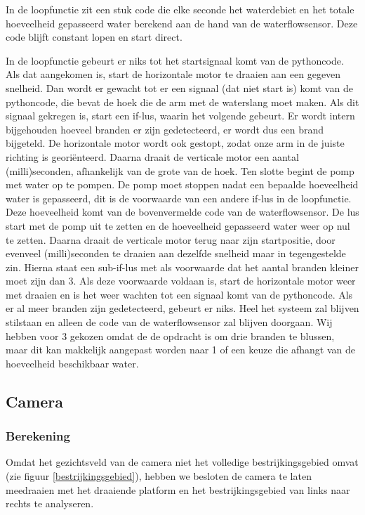 \documentclass[kulak]{kulakarticle} %
\begin{document}
			In de loopfunctie zit een stuk code die elke seconde het waterdebiet en het totale hoeveelheid gepasseerd water berekend aan de hand van de waterflowsensor. Deze code blijft constant lopen en start direct.
			
			In de loopfunctie gebeurt er niks tot het startsignaal komt van de pythoncode. Als dat aangekomen is, start de horizontale motor te draaien aan een gegeven snelheid. Dan wordt er gewacht tot er een signaal (dat niet start is) komt van de pythoncode, die bevat de hoek die de arm met de waterslang moet maken. Als dit signaal gekregen is, start een if-lus, waarin het volgende gebeurt. Er wordt intern bijgehouden hoeveel branden er zijn gedetecteerd, er wordt dus een brand bijgeteld. De horizontale motor wordt ook gestopt, zodat onze arm in de juiste richting is georiënteerd. Daarna draait de verticale motor een aantal (milli)seconden, afhankelijk van de grote van de hoek. Ten slotte begint de pomp met water op te pompen.
			De pomp moet stoppen nadat een bepaalde hoeveelheid water is gepasseerd, dit is de voorwaarde van een andere if-lus in de loopfunctie. Deze hoeveelheid komt van de bovenvermelde code van de waterflowsensor. De lus start met de pomp uit te zetten en de hoeveelheid gepasseerd water weer op nul te zetten. Daarna draait de verticale motor terug naar zijn startpositie, door evenveel (milli)seconden te draaien aan dezelfde snelheid maar in tegengestelde zin. Hierna staat een sub-if-lus met als voorwaarde dat het aantal branden kleiner moet zijn dan 3. Als deze voorwaarde voldaan is, start de horizontale motor weer met draaien en is het weer wachten tot een signaal komt van de pythoncode. Als er al meer branden zijn gedetecteerd, gebeurt er niks. Heel het systeem zal blijven stilstaan en alleen de code van de waterflowsensor zal blijven doorgaan. Wij hebben voor 3 gekozen omdat de de opdracht is om drie branden te blussen, maar dit kan makkelijk aangepast worden naar 1 of een keuze die afhangt van de hoeveelheid beschikbaar water.     
		

	\subsection{Camera}
	
	
		\subsubsection{Berekening}
		
			Omdat het gezichtsveld van de camera niet het volledige bestrijkingsgebied omvat (zie figuur \ref{bestrijkingsgebied}), hebben we besloten de camera te laten meedraaien met het draaiende platform en het bestrijkingsgebied van links naar rechts te analyseren. \\
\end{document}
